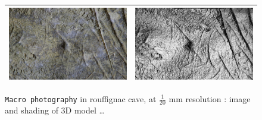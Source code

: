 \begin{figure}
\begin{tabular}{||c|c||}
   \hline \hline 
   \includegraphics[width=80mm]{FIGS/SAMPLES/ROUFF-IM.JPG}&
   \includegraphics[width=80mm]{FIGS/SAMPLES/ROUFF-SHADE.jpg} \\ \hline  \hline 
\end{tabular}
\caption{{\tt Macro photography} in rouffignac cave, at $\frac{1}{20}$ mm resolution : image and shading of 3D model \dots}
\end{figure}


